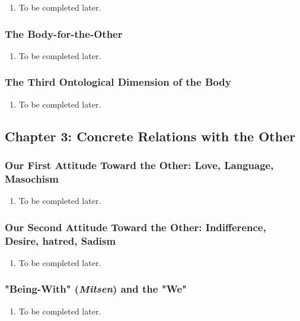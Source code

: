 \begin{enumerate}
  \item To be completed later.
\end{enumerate}

\subsubsection{The Body-for-the-Other}

\begin{enumerate}
  \item To be completed later.
\end{enumerate}

\subsubsection{The Third Ontological Dimension of the Body}

\begin{enumerate}
  \item To be completed later.
\end{enumerate}

\subsection{Chapter 3: Concrete Relations with the Other}

\subsubsection{Our First Attitude Toward the Other: Love, Language, Masochism}

\begin{enumerate}
  \item To be completed later.
\end{enumerate}

\subsubsection{Our Second Attitude Toward the Other: Indifference, Desire, hatred, Sadism}

\begin{enumerate}
  \item To be completed later.
\end{enumerate}

\subsubsection{"Being-With" (\emph{Mitsen}) and the "We"}

\begin{enumerate}
  \item To be completed later.
\end{enumerate}
